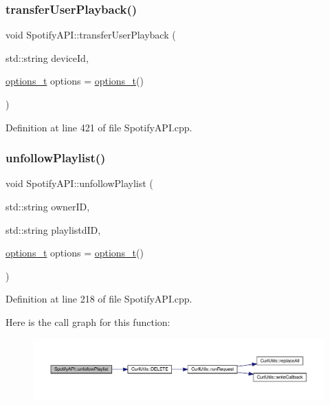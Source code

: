\subsubsection{\texorpdfstring{transfer\+User\+Playback()}{transferUserPlayback()}}
{\footnotesize\ttfamily void Spotify\+A\+P\+I\+::transfer\+User\+Playback (\begin{DoxyParamCaption}\item[{std\+::string}]{device\+Id,  }\item[{\mbox{\hyperlink{_spotify_a_p_i_8h_a0ff5cac1a4007bb330b7d9939650c283}{options\+\_\+t}}}]{options = {\ttfamily \mbox{\hyperlink{_spotify_a_p_i_8h_a0ff5cac1a4007bb330b7d9939650c283}{options\+\_\+t}}()} }\end{DoxyParamCaption})}



Definition at line 421 of file Spotify\+A\+P\+I.\+cpp.

\mbox{\label{class_spotify_a_p_i_a1a89f73e8b0981a13970ed5788189a38}} 
\subsubsection{\texorpdfstring{unfollow\+Playlist()}{unfollowPlaylist()}}
{\footnotesize\ttfamily void Spotify\+A\+P\+I\+::unfollow\+Playlist (\begin{DoxyParamCaption}\item[{std\+::string}]{owner\+ID,  }\item[{std\+::string}]{playlistd\+ID,  }\item[{\mbox{\hyperlink{_spotify_a_p_i_8h_a0ff5cac1a4007bb330b7d9939650c283}{options\+\_\+t}}}]{options = {\ttfamily \mbox{\hyperlink{_spotify_a_p_i_8h_a0ff5cac1a4007bb330b7d9939650c283}{options\+\_\+t}}()} }\end{DoxyParamCaption})}



Definition at line 218 of file Spotify\+A\+P\+I.\+cpp.

Here is the call graph for this function\+:
\nopagebreak
\begin{figure}[H]
\begin{center}
\leavevmode
\includegraphics[width=350pt]{class_spotify_a_p_i_a1a89f73e8b0981a13970ed5788189a38_cgraph}
\end{center}
\end{figure}
\mbox{\label{class_spotify_a_p_i_a7f8c5253bf0fc8cbe8944edfc96ff030}} 

